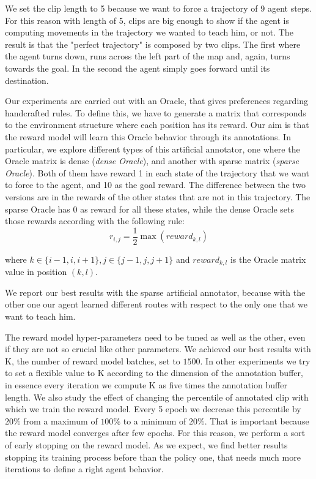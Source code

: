 We set the clip length to 5 because we want to force a trajectory of 9 agent steps. 
For this reason with length of 5, clips are big enough to show if the agent is computing movements in the trajectory we wanted to teach him, or not. The result is that the "perfect trajectory" is composed by two clips. The first where the agent turns down, runs across the left part of the map and, again, turns towards the goal. In the second the agent simply goes forward until its destination.

Our experiments are carried out with an Oracle, that gives preferences regarding handcrafted rules. To define this, we have to generate a matrix that corresponds to the environment structure where each position has its reward. Our aim is that the reward model will learn this Oracle behavior through its annotations. In particular, we explore different types of this artificial annotator, one where the Oracle matrix is dense (\textit{dense Oracle}), and another with sparse matrix (\textit{sparse Oracle}). Both of them have reward 1 in each state of the trajectory that we want to force to the agent, and 10 as the goal reward. The difference between the two versions are in the rewards of the other states that are not in this trajectory. 
The sparse Oracle has 0 as reward for all these states, while the dense Oracle sets those rewards according with the following rule:
\begin{equation*}
	r_{i,j}= \frac{1}{2} \max(reward_{k,l})
\end{equation*}

where $k\in\{i-1,i,i+1\}, j\in\{j-1,j,j+1\}$ and $reward_{k,l}$ is the Oracle matrix value in position $(k,l)$. 

We report our best results with the sparse artificial annotator, because with the other one our agent learned different routes with respect to the only one that we want to teach him.  

The reward model hyper-parameters need to be tuned as well as the other, even if they are not so crucial like other parameters. We achieved our best results with  K, the number of reward model batches, set to $1500$. In other experiments we try to set a flexible value to K according to the dimension of the annotation buffer, in essence every iteration we compute K as five times the annotation buffer length. We also study the effect of changing the percentile of annotated clip with which we train the reward model. Every 5 epoch we decrease this percentile by $20\%$ from a maximum of $100\%$ to a minimum of $20\%$. 
That is important because the reward model converges after few epochs. For this reason, we perform a sort of early stopping on the reward model. As we expect, we find better results stopping its training process before than the policy one, that needs much more iterations to define a right agent behavior. 

